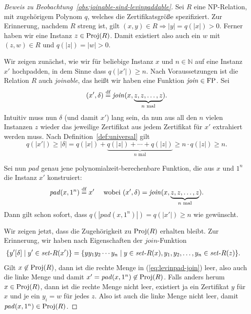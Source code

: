 \medskip
\begin{proof}[Beweis zu Beobachtung~\ref{obs:joinable-sind-levinpaddable}]
    Sei $R$ eine NP-Relation, mit zugehörigem Polynom $q$, welches die Zertifikatsgröße spezifiziert. Zur Erinnerung, nachdem $R$ streng ist, gilt $(x,y)\in R \Rightarrow |y|=q(|x|)>0$.
    Ferner haben wir eine Instanz $z\in\operatorname{Proj}(R)$. Damit existiert also auch ein $w$ mit $(z,w)\in R$ und $q(|z|)=|w|>0$.

    Wir zeigen zunächst, wie wir für beliebige Instanz $x$ und $n\in\mathbb N$ auf eine Instanz $x'$ hochpadden, in dem Sinne dass $q(|x'|) \geq n$.
    Nach Voraussetzungen  ist die Relation $R$ auch \emph{joinable}, das heißt wir haben eine Funktion $\mathit{join}\in\mathrm{FP}$. Sei 
    \[ (x',\delta)\stackrel{\text{df}}{=} \mathit{join}(x, \underbrace{z, z, \ldots, z}_{\text{$n$ mal}}).\]
    Intuitiv muss nun $\delta$ (und damit $x'$) lang sein, da nun aus all den $n$ vielen Instanzen $z$ wieder das jeweilige Zertifikat aus jedem Zertifikat für $x'$ extrahiert werden muss.
    Nach Definition~\ref{def:universal} gilt
    \[ q(|x'|) \geq |\delta|=q(|x|) + \underbrace{q(|z|) + \cdots + q(|z|)}_{\text{$n$ mal}} \geq  n\cdot q(|z|) \geq n. \]

    Sei nun $\mathit{pad}$ genau jene polynomialzeit-berechenbare Funktion, die aus $x$ und $1^n$ die Instanz $x'$ konstruiert:
    \[ \mathit{pad}(x, 1^n) \stackrel{\text{df}}{=}  x' \quad\text{ wobei }
    (x',\delta)=\mathit{join}(x, \underbrace{z,z,\ldots, z}_{\text{$n$ mal}}).\]
    Dann gilt schon sofort, dass $q(|\mathit{pad}(x, 1^n)|)=q(|x'|)\geq n$ wie gewünscht.

    Wir zeigen jetzt, dass die Zugehörigkeit zu $\operatorname{Proj}(R)$ erhalten bleibt.
    Zur Erinnerung, wir haben nach Eigenschaften der $\mathit{join}$-Funktion
    \begin{align}\label{eq:levinpad-join} &\{ y'[\delta] \mid y'\in\fset{}R(x') \} = \{ yy_1y_2\cdots y_{n} \mid  y\in\fset{}R(x), y_1,y_2,\dots,y_n\in\fset{}R(z) \}. \end{align}
    Gilt $x\not\in\operatorname{Proj}(R)$, dann ist die rechte Menge in (\ref{eq:levinpad-join}) leer, also auch die linke Menge und damit $x'=\mathit{pad}(x, 1^n)\not\in \operatorname{Proj}(R)$.
    Falls anders herum $x\in\operatorname{Proj}(R)$, dann ist die rechte Menge nicht leer, existiert ja ein Zertifikat $y$ für $x$ und je ein $y_i=w$ für jedes $z$. Also ist auch die linke Menge nicht leer, damit $\mathit{pad}(x, 1^n)\in \operatorname{Proj}(R)$.


\end{proof}
